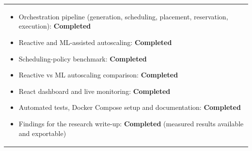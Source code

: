 \documentclass[12pt,a4paper]{article}
\newcommand{\answerbox}[2]{%
    \noindent
    \begin{tabularx}{\textwidth}{
        |>{\raggedright\arraybackslash}X|}
        \hline
        \parbox[t]{\dimexpr\linewidth-12pt\relax}{
            \vspace{5pt}
            \fontsize{10.5}{13}\selectfont #2
            \par\vspace{6pt}
        }\\
        \hline
    \end{tabularx}
}
\begin{document}
\vspace{0.25cm}
\answerbox{3.20cm}{%
\begin{itemize}
    \item Orchestration pipeline (generation, scheduling, placement, reservation, execution):
    \textbf{Completed}
    \item Reactive and ML-assisted autoscaling: \textbf{Completed}
    \item Scheduling-policy benchmark: \textbf{Completed}
    \item Reactive vs ML autoscaling comparison: \textbf{Completed}
    \item React dashboard and live monitoring: \textbf{Completed}
    \item Automated tests, Docker Compose setup and documentation: \textbf{Completed}
    \item Findings for the research write-up: \textbf{Completed} (measured results available and exportable)
\end{itemize}}
\end{document}
